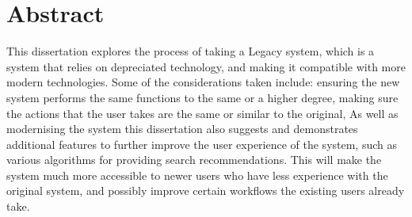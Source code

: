 
\chapter*{Abstract}

This dissertation explores the process of taking a Legacy system,
which is a system that relies on depreciated technology,
and making it compatible with more modern technologies.
Some of the considerations taken include:
ensuring the new system performs the same functions to the same or a higher degree,
making sure the actions that the user takes are the same or similar to the original,
As well as modernising the system this dissertation also suggests and demonstrates
additional features to further improve the user experience of the system,
such as various algorithms for providing search recommendations.
This will make the system much more accessible to newer users who have less experience with the original system,
and possibly improve certain workflows the existing users already take.